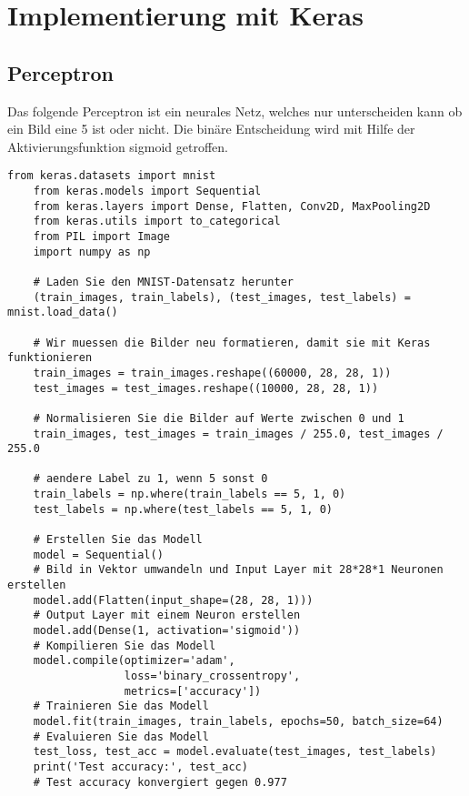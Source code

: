 \section{Implementierung mit Keras}\label{sec:code} 

\subsection{Perceptron}
Das folgende Perceptron ist ein neurales Netz, welches nur unterscheiden kann ob ein Bild eine 5 ist oder nicht. Die binäre Entscheidung wird mit Hilfe
der Aktivierungsfunktion sigmoid getroffen.
\begin{lstlisting}[basicstyle=\ttfamily\footnotesize]
    from keras.datasets import mnist
    from keras.models import Sequential
    from keras.layers import Dense, Flatten, Conv2D, MaxPooling2D
    from keras.utils import to_categorical
    from PIL import Image
    import numpy as np
    
    # Laden Sie den MNIST-Datensatz herunter
    (train_images, train_labels), (test_images, test_labels) = mnist.load_data()
    
    # Wir muessen die Bilder neu formatieren, damit sie mit Keras funktionieren
    train_images = train_images.reshape((60000, 28, 28, 1))
    test_images = test_images.reshape((10000, 28, 28, 1))
    
    # Normalisieren Sie die Bilder auf Werte zwischen 0 und 1
    train_images, test_images = train_images / 255.0, test_images / 255.0
    
    # aendere Label zu 1, wenn 5 sonst 0
    train_labels = np.where(train_labels == 5, 1, 0)
    test_labels = np.where(test_labels == 5, 1, 0)
    
    # Erstellen Sie das Modell
    model = Sequential()
    # Bild in Vektor umwandeln und Input Layer mit 28*28*1 Neuronen erstellen
    model.add(Flatten(input_shape=(28, 28, 1)))
    # Output Layer mit einem Neuron erstellen
    model.add(Dense(1, activation='sigmoid'))
    # Kompilieren Sie das Modell
    model.compile(optimizer='adam',
                  loss='binary_crossentropy',
                  metrics=['accuracy'])
    # Trainieren Sie das Modell
    model.fit(train_images, train_labels, epochs=50, batch_size=64)
    # Evaluieren Sie das Modell
    test_loss, test_acc = model.evaluate(test_images, test_labels)
    print('Test accuracy:', test_acc)
    # Test accuracy konvergiert gegen 0.977
\end{lstlisting}


